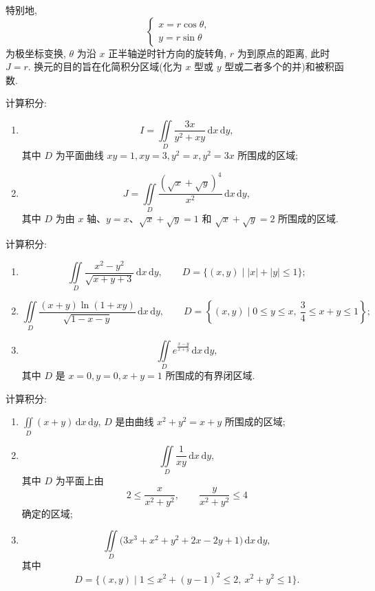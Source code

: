 \documentclass[../数学分析培优讲义.tex]{subfiles}
\begin{document}
\begin{remark}
特别地,
\[
    \begin{cases}
        x=r\cos\theta,\\
        y=r\sin\theta
    \end{cases}
\]
为极坐标变换, $\theta$ 为沿 $x$ 正半轴逆时针方向的旋转角, $r$ 为到原点的距离, 此时 $J=r$. 换元的目的旨在化简积分区域(化为 $x$ 型或 $y$ 型或二者多个的并)和被积函数.
\end{remark}

\begin{example}
计算积分:
\begin{enumerate}[label=(\arabic*)]
    \item
    \[
        I=\iint\limits_D\dfrac{3x}{y^2+xy}\,\mathrm{d}x\,\mathrm{d}y,
    \]
    其中 $D$ 为平面曲线 $xy=1,xy=3,y^2=x,y^2=3x$ 所围成的区域;
    \item
    \[
        J=\iint\limits_D\dfrac{(\sqrt{x}+\sqrt{y})^4}{x^2}\,\mathrm{d}x\,\mathrm{d}y,
    \]
    其中 $D$ 为由 $x$ 轴、$y=x$、$\sqrt{x}+\sqrt{y}=1$ 和 $\sqrt{x}+\sqrt{y}=2$ 所围成的区域.
\end{enumerate}
\end{example}
\exampleblank

\begin{example}
计算积分:
\begin{enumerate}[label=(\arabic*)]
    \item
    \[
        \iint\limits_D\dfrac{x^2-y^2}{\sqrt{x+y+3}}\,\mathrm{d}x\,\mathrm{d}y,
        \qquad D=\{(x,y)\mid |x|+|y|\leq1\};
    \]
    \item
    \[
        \iint\limits_D\dfrac{(x+y)\ln(1+xy)}{\sqrt{1-x-y}}\,\mathrm{d}x\,\mathrm{d}y,
        \qquad D=\left\{(x,y)\mid0\leq y\leq x,\ \dfrac{3}{4}\leq x+y\leq1\right\};
    \]
    \item
    \[
        \iint\limits_De^{\frac{x-y}{x+y}}\,\mathrm{d}x\,\mathrm{d}y,
    \]
    其中 $D$ 是 $x=0,y=0,x+y=1$ 所围成的有界闭区域.
\end{enumerate}
\end{example}
\exampleblank

\begin{example}
计算积分:
\begin{enumerate}[label=(\arabic*)]
    \item $\displaystyle\iint\limits_D(x+y)\,\mathrm{d}x\,\mathrm{d}y$, $D$ 是由曲线 $x^2+y^2=x+y$ 所围成的区域;
    \item
    \[
        \iint\limits_D\dfrac{1}{xy}\,\mathrm{d}x\,\mathrm{d}y,
    \]
    其中 $D$ 为平面上由
    \[
        2\leq\dfrac{x}{x^2+y^2},\qquad
        \dfrac{y}{x^2+y^2}\leq4
    \]
    确定的区域;
    \item
    \[
        \iint\limits_D\bigl(3x^3+x^2+y^2+2x-2y+1\bigr)\,\mathrm{d}x\,\mathrm{d}y,
    \]
    其中
    \[
        D=\{(x,y)\mid1\leq x^2+(y-1)^2\leq2,\ x^2+y^2\leq1\}.
    \]
\end{enumerate}
\end{example}
\exampleblank
\end{document}

